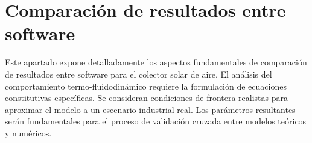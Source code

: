 \section{Comparación de resultados entre software}
\label{sec:cap09_comparacion}

Este apartado expone detalladamente los aspectos fundamentales de comparación de resultados entre software para el colector solar de aire.
El análisis del comportamiento termo-fluidodinámico requiere la formulación de ecuaciones constitutivas específicas.
Se consideran condiciones de frontera realistas para aproximar el modelo a un escenario industrial real.
Los parámetros resultantes serán fundamentales para el proceso de validación cruzada entre modelos teóricos y numéricos.
